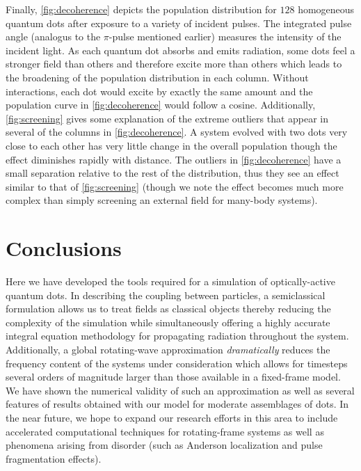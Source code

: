 \documentclass[conference]{IEEEtran}
\begin{document}
Finally, \cref{fig:decoherence} depicts the population distribution for $128$ homogeneous quantum dots after exposure to a variety of incident pulses.
The integrated pulse angle (analogus to the $\pi$-pulse mentioned earlier) measures the intensity of the incident light.
As each quantum dot absorbs and emits radiation, some dots feel a stronger field than others and therefore excite more than others which leads to the broadening of the population distribution in each column.
Without interactions, each dot would excite by exactly the same amount and the population curve in \cref{fig:decoherence} would follow a cosine.
Additionally, \cref{fig:screening} gives some explanation of the extreme outliers that appear in several of the columns in \cref{fig:decoherence}.
A system evolved with two dots very close to each other has very little change in the overall population though the effect diminishes rapidly with distance.
The outliers in \cref{fig:decoherence} have a small separation relative to the rest of the distribution, thus they see an effect similar to that of \cref{fig:screening} (though we note the effect becomes much more complex than simply screening an external field for many-body systems).


\section{Conclusions}
Here we have developed the tools required for a simulation of optically-active quantum dots.
In describing the coupling between particles, a semiclassical formulation allows us to treat fields as classical objects thereby reducing the complexity of the simulation while simultaneously offering a highly accurate integral equation methodology for propagating radiation throughout the system.
Additionally, a global rotating-wave approximation \emph{dramatically} reduces the frequency content of the systems under consideration which allows for timesteps several orders of magnitude larger than those available in a fixed-frame model.
We have shown the numerical validity of such an approximation as well as several features of results obtained with our model for moderate assemblages of dots.
In the near future, we hope to expand our research efforts in this area to include accelerated computational techniques for rotating-frame systems as well as phenomena arising from disorder (such as Anderson localization and pulse fragmentation effects).


{}

\end{document}
